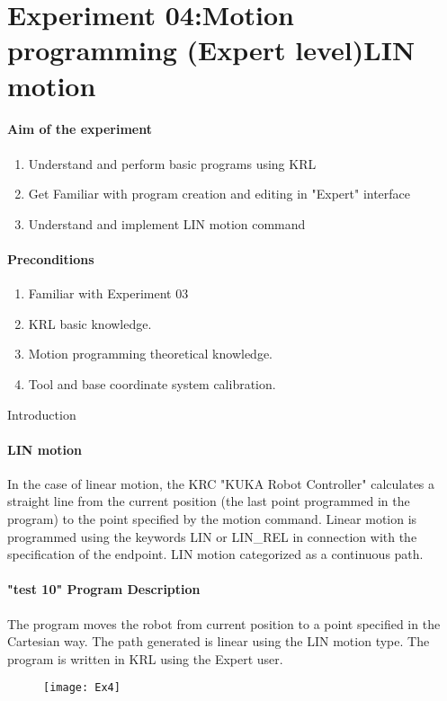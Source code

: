 \section{Experiment 04:Motion programming (Expert level)LIN motion}
\paragraph{Aim of the experiment}
\begin{enumerate}
	\item  Understand and perform basic programs using KRL
	\item  Get Familiar with program creation and editing in "Expert" interface
	\item  Understand and implement LIN motion command
\end{enumerate}
\paragraph{Preconditions}
\begin{enumerate}
	\item  Familiar with Experiment 03
	\item  KRL basic knowledge.
	\item  Motion programming theoretical knowledge. 
	\item Tool and base coordinate system calibration.

\end{enumerate}
{Introduction}
\paragraph{LIN motion}
In the case of linear motion, the KRC "KUKA Robot Controller" calculates a straight line from the current position (the last point programmed in the program) to the point specified by the motion command. Linear motion is programmed using the keywords LIN or LIN\_REL in connection with the specification of the endpoint.
LIN motion categorized as a continuous path.
\paragraph{"test 10" Program Description}
The program moves the robot from current position to a point specified in the Cartesian way.  The path generated is linear using the LIN motion type. The program is written in KRL using the Expert user.
\begin{figure}[H]
	\centering
	\texttt{[image: Ex4]}
\end{figure}
